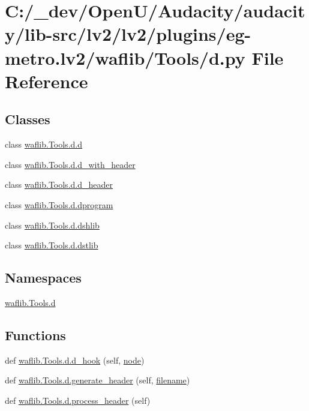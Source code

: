 \hypertarget{lv2_2plugins_2eg-metro_8lv2_2waflib_2_tools_2d_8py}{}\section{C\+:/\+\_\+dev/\+Open\+U/\+Audacity/audacity/lib-\/src/lv2/lv2/plugins/eg-\/metro.lv2/waflib/\+Tools/d.py File Reference}
\label{lv2_2plugins_2eg-metro_8lv2_2waflib_2_tools_2d_8py}
\subsection*{Classes}
\begin{DoxyCompactItemize}
\item 
class \hyperlink{classwaflib_1_1_tools_1_1d_1_1d}{waflib.\+Tools.\+d.\+d}
\item 
class \hyperlink{classwaflib_1_1_tools_1_1d_1_1d__with__header}{waflib.\+Tools.\+d.\+d\+\_\+with\+\_\+header}
\item 
class \hyperlink{classwaflib_1_1_tools_1_1d_1_1d__header}{waflib.\+Tools.\+d.\+d\+\_\+header}
\item 
class \hyperlink{classwaflib_1_1_tools_1_1d_1_1dprogram}{waflib.\+Tools.\+d.\+dprogram}
\item 
class \hyperlink{classwaflib_1_1_tools_1_1d_1_1dshlib}{waflib.\+Tools.\+d.\+dshlib}
\item 
class \hyperlink{classwaflib_1_1_tools_1_1d_1_1dstlib}{waflib.\+Tools.\+d.\+dstlib}
\end{DoxyCompactItemize}
\subsection*{Namespaces}
\begin{DoxyCompactItemize}
\item 
 \hyperlink{namespacewaflib_1_1_tools_1_1d}{waflib.\+Tools.\+d}
\end{DoxyCompactItemize}
\subsection*{Functions}
\begin{DoxyCompactItemize}
\item 
def \hyperlink{namespacewaflib_1_1_tools_1_1d_a0b6f5907fb19962703822b05f5d2c7f6}{waflib.\+Tools.\+d.\+d\+\_\+hook} (self, \hyperlink{structnode}{node})
\item 
def \hyperlink{namespacewaflib_1_1_tools_1_1d_abeab4cb06670217a6a35b8a77933e947}{waflib.\+Tools.\+d.\+generate\+\_\+header} (self, \hyperlink{test__portburn_8cpp_a7efa5e9c7494c7d4586359300221aa5d}{filename})
\item 
def \hyperlink{namespacewaflib_1_1_tools_1_1d_ae7724c426c7d6b03c2f1e81bf03f40a9}{waflib.\+Tools.\+d.\+process\+\_\+header} (self)
\end{DoxyCompactItemize}
